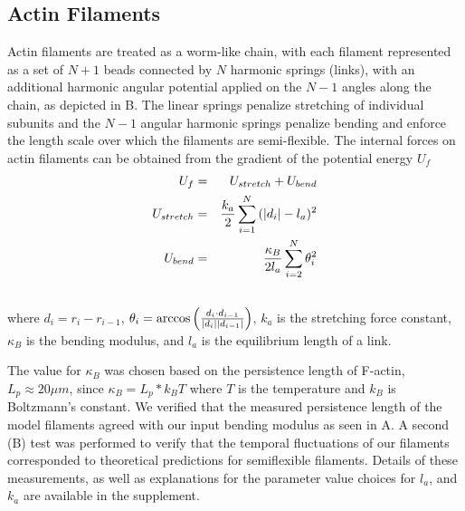 \documentclass[12pt]{article}
\begin{document}
\subsection{Actin Filaments}
Actin filaments are treated as a worm-like chain, with each filament represented
as a set of $N+1$ beads connected by $N$ harmonic springs (links), with an 
additional harmonic angular potential applied on the $N-1$ angles along the
chain, as depicted in B. The linear springs 
penalize stretching of individual subunits and the $N-1$ angular harmonic
springs penalize bending and enforce the length scale over which the filaments
are semi-flexible. 
The internal forces on actin filaments can be obtained from the gradient of the
potential energy $U_f$
\begin{eqnarray}
  U_f &=& U_{stretch} + U_{bend}\\
  U_{stretch}&=&{k_a\over2}\sum_{i=1}^{N}{(|d_i| - l_a)^2}\\\nonumber
  U_{bend}&=&{\kappa_B\over 2l_a}\sum_{i=2}^N{\theta_i^2}\\\nonumber
  \label{eqn:Ufil}
\end{eqnarray}
where $d_i = r_i-r_{i-1}$, $\theta_i = \arccos{\left({d_i\cdot d_{i-1}\over |d_i||d_{i-1}|}\right)}$, $k_a$ is the
stretching force constant, $\kappa_B$ is the bending modulus, and $l_a$ is the
equilibrium length of a link. 
\par
The value for $\kappa_B$ was chosen based on the
persistence length of F-actin, $L_p\approx20\mu m$, since $\kappa_B=L_p*k_BT$ 
where $T$ is the temperature and $k_B$ is Boltzmann's constant\cite{rubinstein}.
We verified that the measured persistence length of the model filaments agreed with our input 
bending modulus as seen in A. A second (B)
test was performed to verify that the temporal fluctuations of our filaments corresponded to 
theoretical predictions for semiflexible filaments\cite{everaers1999}. 
Details of these measurements, as well as explanations for the parameter 
value choices for $l_a$, and $k_a$ are available in the supplement.  
\end{document}
